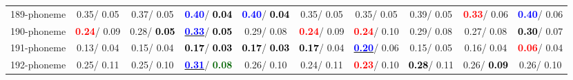 \begin{table}[h]
\begin{center}
{\begin{tabular}{lc|c|c|c|c|c|c|c|c}
189-phoneme &   0.35/  0.05 &   0.37/  0.05 & \textcolor{blue}{\textbf{  0.40}}/\textcolor{black}{\textbf{  0.04}} & \textcolor{blue}{\textbf{  0.40}}/\textcolor{black}{\textbf{  0.04}} &   0.35/  0.05 &   0.35/  0.05 &   0.39/  0.05 & \textcolor{red}{\textbf{  0.33}}/  0.06 & \textcolor{blue}{\textbf{  0.40}}/  0.06 \\
190-phoneme & \textcolor{red}{\textbf{  0.24}}/  0.09 &   0.28/\textcolor{black}{\textbf{  0.05}} & \underline{\textcolor{blue}{\textbf{  0.33}}}/\textcolor{black}{\textbf{  0.05}} &   0.29/  0.08 & \textcolor{red}{\textbf{  0.24}}/  0.09 & \textcolor{red}{\textbf{  0.24}}/  0.10 &   0.29/  0.08 &   0.27/  0.08 & \textcolor{black}{\textbf{  0.30}}/  0.07 \\
191-phoneme &   0.13/  0.04 &   0.15/  0.04 & \textcolor{black}{\textbf{  0.17}}/\textcolor{black}{\textbf{  0.03}} & \textcolor{black}{\textbf{  0.17}}/\textcolor{black}{\textbf{  0.03}} & \textcolor{black}{\textbf{  0.17}}/  0.04 & \underline{\textcolor{blue}{\textbf{  0.20}}}/  0.06 &   0.15/  0.05 &   0.16/  0.04 & \textcolor{red}{\textbf{  0.06}}/  0.04 \\
192-phoneme &   0.25/  0.11 &   0.25/  0.10 & \underline{\textcolor{blue}{\textbf{  0.31}}}/\textcolor{darkgreen}{\textbf{  0.08}} &   0.26/  0.10 &   0.24/  0.11 & \textcolor{red}{\textbf{  0.23}}/  0.10 & \textcolor{black}{\textbf{  0.28}}/  0.11 &   0.26/\textcolor{black}{\textbf{  0.09}} &   0.26/  0.10 \\\end{tabular}}\label{stratsALCKappa5AllReduxhalfa}
\end{center}
\end{table}
